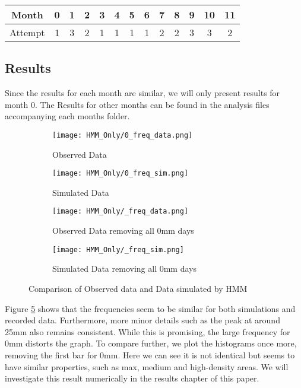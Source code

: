     \begin{center}
    \begin{tabular}{c | c | c | c | c | c | c | c | c | c | c | c | c}
        Month   &  0  & 1 & 2 & 3 & 4 & 5 & 6 & 7 & 8 & 9 & 10 & 11 \\
        \hline
        Attempt &  1  & 3 & 2 & 1 & 1 & 1 & 1 & 2 & 2 & 3 & 3  & 2 
    \end{tabular}  
    \end{center}

    \subsection{Results}
    \label{Simple_Rainfall_HMM:Analysis:Resutls}

    Since the results for each month are similar, we will only present results for month 0. The Results for other months can be found in the analysis files accompanying each months folder. 

    \begin{figure}
        \begin{subfigure}{.45\textwidth}
        \centering
        \texttt{[image: HMM\_Only/0\_freq\_data.png]}
        \caption{Observed Data}
        \label{inc0:data}
        \end{subfigure}
        \begin{subfigure}{.45\textwidth}
        \centering
        \texttt{[image: HMM\_Only/0\_freq\_sim.png]}
        \caption{Simulated Data}
        \label{inc0:sim}
        \end{subfigure}

        \begin{subfigure}{.45\textwidth}
        \centering
        \texttt{[image: HMM\_Only/\_freq\_data.png]}
        \caption{Observed Data removing all 0mm days}
        \label{inc0:n0data}
        \end{subfigure}
        \begin{subfigure}{.45\textwidth}
        \centering
        \texttt{[image: HMM\_Only/\_freq\_sim.png]}
        \caption{Simulated Data removing all 0mm days}
        \label{inc0:n0sim}
        \end{subfigure}
        \caption{Comparison of Observed data and Data simulated by HMM}
        \label{inc0}
    \end{figure}

    Figure \ref{inc0} shows that the frequencies seem to be similar for both simulations and recorded data. Furthermore, more minor details such as the peak at around 25mm also remains consistent. While this is promising, the large frequency for 0mm distorts the graph. To compare further, we plot the histograms once more, removing the first bar for 0mm. Here we can see it is not identical but seems to have similar properties, such as max, medium and high-density areas. We will investigate this result numerically in the results chapter of this paper.


    